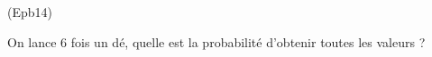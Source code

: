 \begin{tiny}(Epb14)\end{tiny} On lance 6 fois un dé, quelle est la probabilité d'obtenir toutes les valeurs ? 